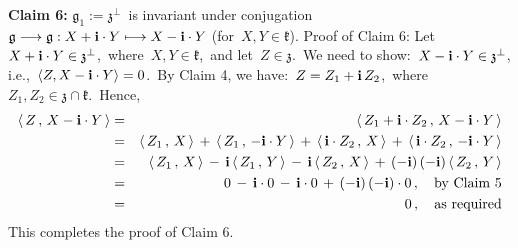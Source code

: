 \vskip 0.3cm
\noindent
\textbf{Claim 6:}\;\; $\mathfrak{g}_{1} := \mathfrak{z}^{\perp}$\, is invariant under conjugation
\,$\mathfrak{g} \longrightarrow \mathfrak{g} : X + \mathbf{i} \cdot Y \longmapsto X - \mathbf{i}\cdot Y$
(for \,$X, Y \in \mathfrak{k}$).
\vskip 0.05cm
\noindent
Proof of Claim 6:\;\;
Let \,$X + \mathbf{i}\cdot Y \in \mathfrak{z}^{\perp}$,\, where \,$X, Y \in \mathfrak{k}$,\, and
let \,$Z \in \mathfrak{z}$.\,
We need to show: \,$X - \mathbf{i}\cdot Y \in \mathfrak{z}^{\perp}$,
i.e., \,$\langle Z, X - \mathbf{i}\cdot Y \rangle = 0$.\,
By Claim 4, we have: \,$Z = Z_{1} + \mathbf{i}\,Z_{2}$,\,
where \,$Z_{1}, Z_{2} \in \mathfrak{z} \cap \mathfrak{k}$.\,
Hence,
\begin{eqnarray*}
\langle\,Z\,,\,X - \mathbf{i}\cdot Y\,\rangle
& = &
    \langle\,Z_{1} + \mathbf{i}\cdot Z_{2}\,,\,X - \mathbf{i}\cdot Y\,\rangle
\\
& = &
    \langle\,Z_{1}\,,\,X\,\rangle
    \,+\,
    \langle\,Z_{1}\,,\,- \mathbf{i}\cdot Y\,\rangle
    \,+\,
    \langle\,\mathbf{i}\cdot Z_{2}\,,\,X\,\rangle
    \,+\,
    \langle\,\mathbf{i}\cdot Z_{2}\,,\,- \mathbf{i}\cdot Y\,\rangle
\\
& = &
    \langle\,Z_{1}\,,\,X\,\rangle
    \,-\,
    \mathbf{i}\,\langle\,Z_{1}\,,\,Y\,\rangle
    \,-\,
    \mathbf{i}\,\langle\,Z_{2}\,,\,X\,\rangle
    \,+\,
    (-\mathbf{i})\,(-\mathbf{i})\,\langle\,Z_{2}\,,\,Y\,\rangle
\\
& = &
    0
    \,-\,
    \mathbf{i}\cdot 0
    \,-\,
    \mathbf{i}\cdot 0
    \,+\,
    (-\mathbf{i})\,(-\mathbf{i})\cdot 0\,,
    \quad
    \textnormal{by Claim 5}
\\
& = &
    0\,,
\quad
\textnormal{as required}
\end{eqnarray*}
This completes the proof of Claim 6.


